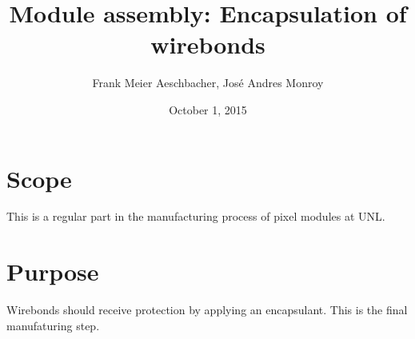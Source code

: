 \documentclass[12pt]{unlsilabsop}
\title{Module assembly: Encapsulation of wirebonds}
\date{October 1, 2015}
\author{Frank Meier Aeschbacher, José Andres Monroy}
\begin{document}
\maketitle

\section{Scope}
This is a regular part in the manufacturing process of pixel modules at UNL.

\section{Purpose}
Wirebonds should receive protection by applying an encapsulant. This is the final manufaturing step.



\end{document}

